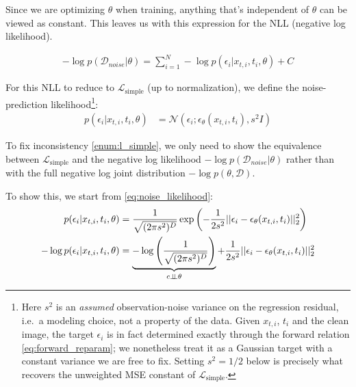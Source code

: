 Since we are optimizing $\theta$ when training, anything that's independent of $\theta$ can be viewed as constant. This leaves us with this expression for the \acs{NLL} (negative log likelihood).

\begin{align}
-\log p(\mathcal{D}_{noise} | \theta) = \sum_{i=1}^N -\log p(\epsilon_i | x_{t,i}, t_i, \theta) + C \label{eq:general_noise_likelihood}
\end{align}

For this \acs{NLL} to reduce to $\mathcal{L}_{\mathrm{simple}}$ (up to normalization), we define the noise-prediction likelihood\footnote{Here $s^2$ is an \emph{assumed} observation-noise variance on the regression residual, i.e.\ a modeling choice, not a property of the data. Given $x_{t,i}$, $t_i$ and the clean image, the target $\epsilon_i$ is in fact determined exactly through the forward relation \eqref{eq:forward_reparam}; we nonetheless treat it as a Gaussian target with a constant variance we are free to fix. Setting $s^2 = 1/2$ below is precisely what recovers the unweighted \acs{MSE} constant of $\mathcal{L}_{\mathrm{simple}}$.}:
\begin{align}
    p(\epsilon_i | x_{t,i}, t_i, \theta) &= \mathcal{N}\left(\epsilon_i; \epsilon_\theta(x_{t,i}, t_i), s^2 I\right) \label{eq:noise_likelihood}
\end{align}

To fix inconsistency \ref{enum:l_simple}, we only need to show the equivalence between $\mathcal{L}_{\mathrm{simple}}$ and the negative log likelihood $-\log p(\mathcal{D}_{noise}|\theta)$ rather than with the full negative log joint distribution $- \log p(\theta,\mathcal{D})$.


To show this, we start from \eqref{eq:noise_likelihood}:
\begin{align}
p(\epsilon_i | x_{t,i}, t_i, \theta) &= \frac{1}{\sqrt{(2\pi s^2)^D}} \exp\left( - \frac{1}{2s^2} ||\epsilon_i - \epsilon_\theta(x_{t,i}, t_i)||_2^2 \right) \nonumber \\
-\log p(\epsilon_i | x_{t,i}, t_i, \theta) &= \underbrace{-\log\left( \frac{1}{\sqrt{(2\pi s^2)^D}} \right)}_{c \perp\!\!\!\perp \theta} + \frac{1}{2s^2} ||\epsilon_i - \epsilon_\theta(x_{t,i}, t_i)||_2^2 \nonumber
\end{align}

